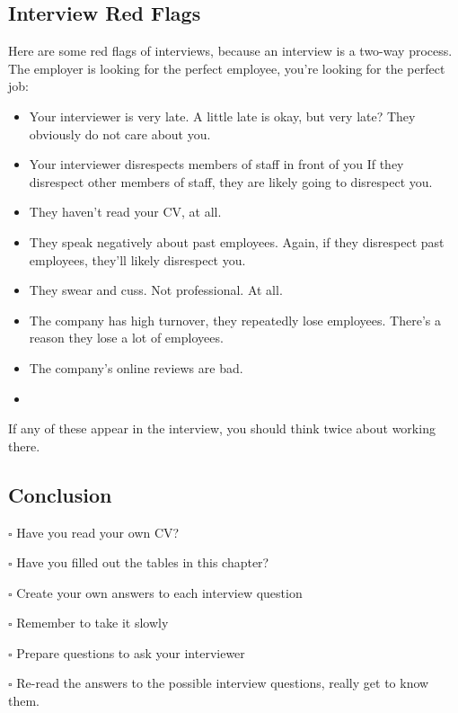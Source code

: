 \documentclass{article}
\begin{document}
\subsection{Interview Red Flags}
Here are some red flags of interviews, because an interview is a two-way
process. The employer is looking for the perfect employee, you're
looking for the perfect job:

\begin{itemize}
\item
  Your interviewer is very late. A little late is okay, but very late?
  They obviously do not care about you.
\end{itemize}

\begin{itemize}
\item
  Your interviewer disrespects members of staff in front of you If they
  disrespect other members of staff, they are likely going to disrespect
  you.
\end{itemize}

\begin{itemize}
\item
  They haven't read your CV, at all.
\item
  They speak negatively about past employees. Again, if they disrespect
  past employees, they'll likely disrespect you.
\item
  They swear and cuss. Not professional. At all.
\item
  The company has high turnover, they repeatedly lose employees. There's
  a reason they lose a lot of employees.
\item
  The company's online reviews are bad.
\item
\end{itemize}

If any of these appear in the interview, you should think twice about
working there.
\subsection{Conclusion}
$\square$ Have you read your own CV?

$\square$ Have you filled out the tables in this chapter?

$\square$ Create your own answers to each interview question

$\square$ Remember to take it slowly

$\square$ Prepare questions to ask your interviewer

$\square$ Re-read the answers to the possible interview questions, really get to
know them.
\end{document}
